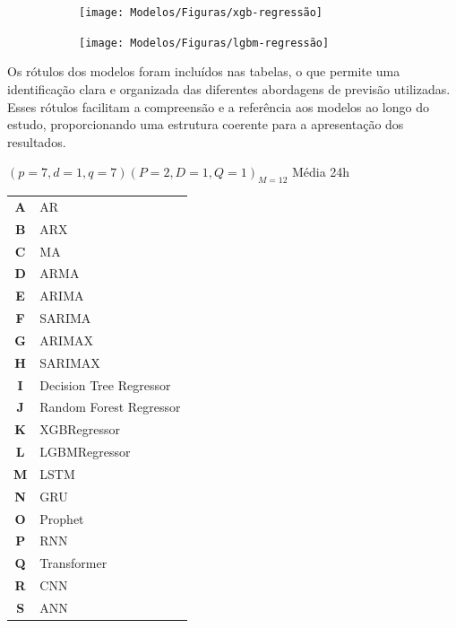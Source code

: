 \begin{figure}[H]
	\centering
	\caption{Resultados da regressão utilizando XGBoost e LightGBM \label{fig:xgb}\label{fig:lgb}}
	\label{fig:1-xgb-regressao}
	
	\begin{subfigure}{1\textwidth}
			\texttt{[image: Modelos/Figuras/xgb-regressão]}
			
		\end{subfigure}\hfill
	\begin{subfigure}{1\textwidth}
			\texttt{[image: Modelos/Figuras/lgbm-regressão]}
			
		\end{subfigure}
	


\end{figure}	



Os rótulos dos modelos foram incluídos nas tabelas, o que permite uma identificação clara e organizada das diferentes abordagens de previsão utilizadas. Esses rótulos facilitam a compreensão e a referência aos modelos ao longo do estudo, proporcionando uma estrutura coerente para a apresentação dos resultados.

$(p = 7,d = 1,q = 7) (P = 2,D = 1,Q = 1)_{M = 12}$ Média 24h
 
\begin{table}[H]
	\begin{tabular}{cl}
			\textbf{A} & AR                      \\
			\textbf{B} & ARX                     \\
			\textbf{C} & MA                      \\
			\textbf{D} & ARMA                    \\
			\textbf{E} & ARIMA                   \\
			\textbf{F} & SARIMA                  \\
			\textbf{G} & ARIMAX                  \\
			\textbf{H} & SARIMAX                 \\
			\textbf{I} & Decision Tree Regressor  \\
			\textbf{J} & Random Forest Regressor \\
			\textbf{K} & XGBRegressor            \\
			\textbf{L} & LGBMRegressor           \\
			\textbf{M} & LSTM                    \\
			\textbf{N} & GRU                     \\
			\textbf{O} & Prophet                 \\
			\textbf{P} & RNN                     \\
			\textbf{Q} & Transformer            \\
			\textbf{R} & CNN\\
			\textbf{S} & ANN
			
		\end{tabular}
\end{table}



